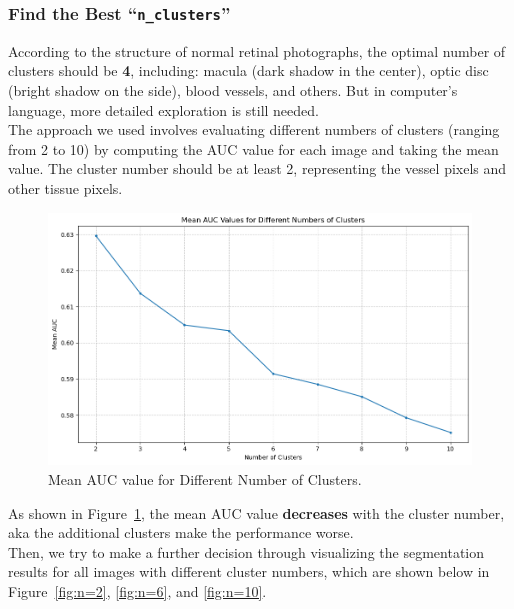 \documentclass[12pt,letterpaper]{article}
\begin{document}
\subsubsection{Find the Best ``\texttt{n\_clusters}''}
According to the structure of normal retinal photographs, the optimal number of clusters should be \textbf{4}, including: macula (dark shadow in the center), optic disc (bright shadow on the side), blood vessels, and others. But in computer's language, more detailed exploration is still needed. \\
The approach we used involves evaluating different numbers of clusters (ranging from 2 to 10) by computing the AUC value for each image and taking the mean value. The cluster number should be at least 2, representing the vessel pixels and other tissue pixels. 
\begin{figure}[H]
    \centering
    \includegraphics[scale=0.5]{Figures/1-1 Find the Best n_clusters.png}
    \caption{Mean AUC value for Different Number of Clusters.}
    \label{fig:nclusters}
\end{figure}
\noindent
As shown in Figure~\ref{fig:nclusters}, the mean AUC value \textbf{decreases} with the cluster number, aka the additional clusters make the performance worse. \\
Then, we try to make a further decision through visualizing the segmentation results for all images with different cluster numbers, which are shown below in Figure~\ref{fig:n=2}, \ref{fig:n=6}, and \ref{fig:n=10}. 
\end{document}
